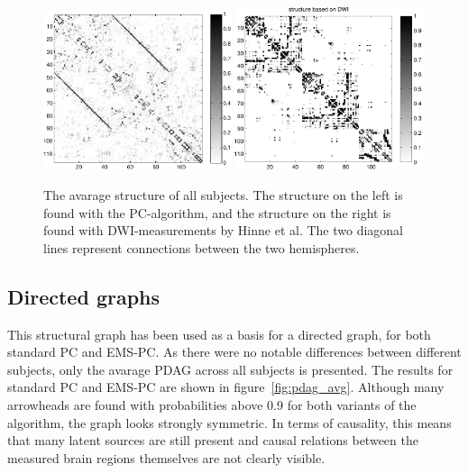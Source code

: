 \documentclass[a4paper, 10pt, english, onecolumn]{article}
\begin{document}
\begin{figure}[h!]
  \centering
  \includegraphics[width=0.49\textwidth]{images/struct_full}
  \includegraphics[width=0.49\textwidth]{images/structure_max}
  \caption{The avarage structure of all subjects. The structure on the left is found with the PC-algorithm, and the structure on the right is found with DWI-measurements by Hinne et al. The two diagonal lines represent connections between the two hemispheres.}
\label{fig:struct_avg}
\end{figure}

\subsection{Directed graphs}
This structural graph has been used as a basis for a directed graph, for both standard PC and EMS-PC.
As there were no notable differences between different subjects, only the avarage PDAG across all subjects is presented.
The results for standard PC and EMS-PC are shown in figure~\ref{fig:pdag_avg}.
Although many arrowheads are found with probabilities above 0.9 for both variants of the algorithm, the graph looks strongly symmetric.
In terms of causality, this means that many latent sources are still present and causal relations between the measured brain regions themselves are not clearly visible.
\end{document}

